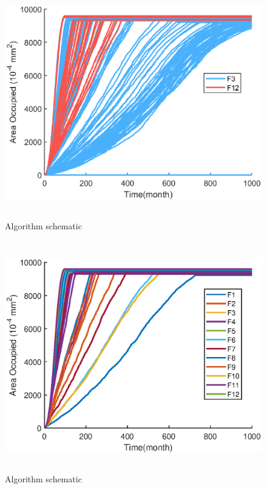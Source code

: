 \documentclass{mcmthesis}
\begin{document}
\begin{figure}[H] 
	\centering 
	\includegraphics[height=10cm]{./picture/3vs12.eps}
	\caption{Algorithm schematic}
\end{figure}
\par 
\begin{figure}[H] 
	\centering 
	\includegraphics[height=10cm]{./picture/12for5.eps}
	\caption{Algorithm schematic}
\end{figure}
\par 
\end{document}
